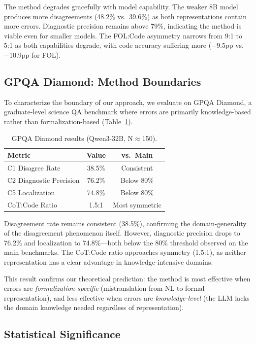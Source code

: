 \documentclass[11pt,a4paper]{article}
\begin{document}
The method degrades gracefully with model capability. The weaker 8B model produces more disagreements (48.2\% vs.\ 39.6\%) as both representations contain more errors. Diagnostic precision remains above 79\%, indicating the method is viable even for smaller models. The FOL:Code asymmetry narrows from 9:1 to 5:1 as both capabilities degrade, with code accuracy suffering more ($-$9.5pp vs.\ $-$10.9pp for FOL).

\subsection{GPQA Diamond: Method Boundaries}
\label{sec:gpqa}

To characterize the boundary of our approach, we evaluate on GPQA Diamond, a graduate-level science QA benchmark where errors are primarily knowledge-based rather than formalization-based (Table~\ref{tab:gpqa}).

\begin{table}[t]
\centering
\small
\caption{GPQA Diamond results (Qwen3-32B, N$\approx$150).}
\label{tab:gpqa}
\begin{tabular}{@{}lcc@{}}
\toprule
\textbf{Metric} & \textbf{Value} & \textbf{vs.\ Main} \\
\midrule
C1 Disagree Rate & 38.5\% & Consistent \\
C2 Diagnostic Precision & 76.2\% & Below 80\% \\
C5 Localization & 74.8\% & Below 80\% \\
CoT:Code Ratio & 1.5:1 & Most symmetric \\
\bottomrule
\end{tabular}
\end{table}

Disagreement rate remains consistent (38.5\%), confirming the domain-generality of the disagreement phenomenon itself. However, diagnostic precision drops to 76.2\% and localization to 74.8\%---both below the 80\% threshold observed on the main benchmarks. The CoT:Code ratio approaches symmetry (1.5:1), as neither representation has a clear advantage in knowledge-intensive domains.

This result confirms our theoretical prediction: the method is most effective when errors are \emph{formalization-specific} (mistranslation from NL to formal representation), and less effective when errors are \emph{knowledge-level} (the LLM lacks the domain knowledge needed regardless of representation).

\subsection{Statistical Significance}
\label{sec:significance}
\end{document}
